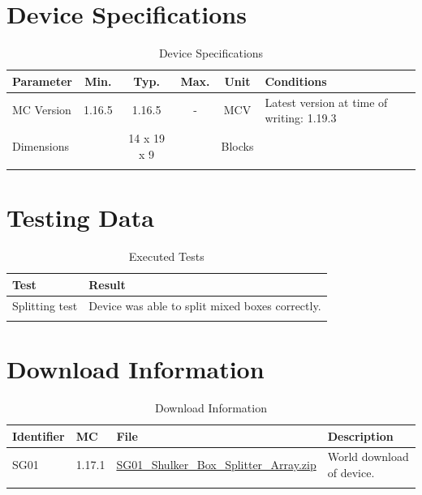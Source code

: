 \documentclass[10pt]{datasheet}
\begin{document}
\onecolumn

\section{Device Specifications}

\begin{table}[h]
    \caption{Device Specifications}
    \begin{tabularx}{\textwidth}{l | c c c | c | X}
        \thickhline
        \textbf{Parameter} & \textbf{Min.} & \textbf{Typ.} & \textbf{Max.} &
        \textbf{Unit} & \textbf{Conditions} \\
        \hline
        MC Version & 1.16.5 & 1.16.5 & - & MCV & Latest version at time of writing: 1.19.3\\
        \hline
        Dimensions & & 14 x 19 x 9 & & Blocks & \\
        \thickhline
\end{tabularx}
\end{table}
\newpage
\section{Testing Data}
\begin{table}[h]
\caption{Executed Tests}
\begin{tabularx}{\textwidth}{l | X}
    \thickhline
    \textbf{Test} & \textbf{Result} \\
    \hline
    Splitting test & Device was able to split mixed boxes correctly. \\
    \thickhline
\end{tabularx}
\end{table}

\section{Download Information}
\begin{table}[h]
    \caption{Download Information}
    \begin{tabularx}{\textwidth}{l | l | l | X}
        \thickhline
        \textbf{Identifier} & \textbf{MC} & \textbf{File} & \textbf{Description} \\
        \hline
        SG01 & 1.17.1 & \href{https://github.com/Soontech-Annals/Archive/blob/92d3541e07ddc3ab90360e923907f040eca76834/Archive/splitting/SG01\%20Shulker\%20Box\%20Splitter\%20Array/SG01\_Shulker\_Box\_Splitter\_Array.zip?raw=1}{SG01\_Shulker\_Box\_Splitter\_Array.zip} & World download of device. \\
        \hline
        \thickhline
    \end{tabularx}
\end{table}
\end{document}
